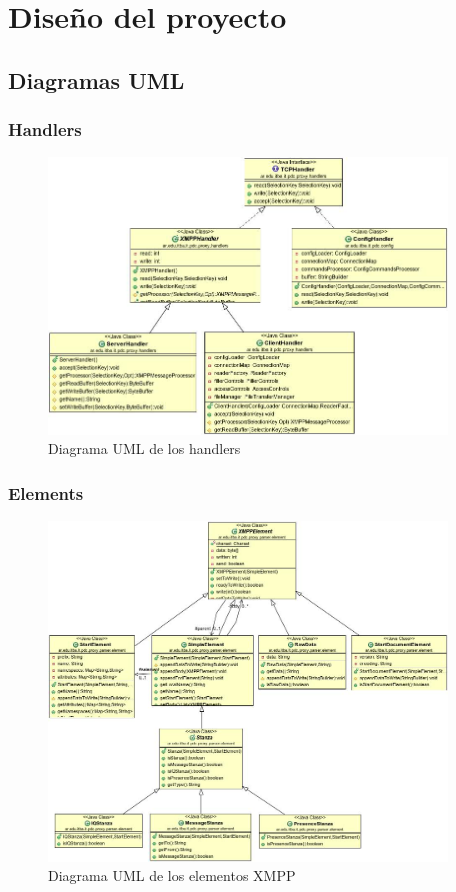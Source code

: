 \documentclass[a4paper,10pt]{article}
\begin{document}
\newpage
\section{Diseño del proyecto}

\subsection{Diagramas UML}
\subsubsection{Handlers}
\begin{figure}[h]
	\centering
	\includegraphics[width=400px]{UML/Handlers}  
	\caption{Diagrama UML de los handlers}
	\label{figure:Handlers}
\end{figure}

\newpage
\subsubsection{Elements}
\begin{figure}[h]
	\centering
	\includegraphics[width=400px]{UML/Elements}  
	\caption{Diagrama UML de los elementos XMPP}
	\label{figure:Elements}
\end{figure}
\end{document}
